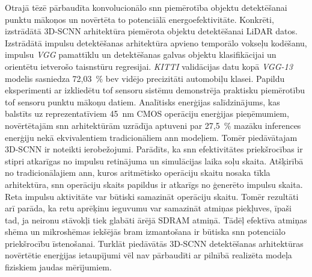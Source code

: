 Otrajā tēzē pārbaudīta konvolucionālo \Gls{snn} piemērotība objektu detektēšanai punktu mākoņos un novērtēta to potenciālā
energoefektivitāte.
Konkrēti, izstrādātā 3D-SCNN arhitektūra piemērota objektu detektēšanai LiDAR datos. Izstrādātā
impulsu detektēšanas arhitektūra apvieno temporālo vokseļu kodēšanu, impulsu \textit{VGG} pamattīklu un detektēšanas galvas
objektu klasifikācijai un orientētu ietverošo taisnstūru regresijai. \textit{KITTI} validācijas datu kopā \textit{VGG-13}
modelis sasniedza 72,03~\% \Gls{bev} vidējo precizitāti automobiļu klasei. Papildu eksperimenti ar izkliedētu \Gls{tof}
sensoru sistēmu demonstrēja praktisku piemērotību \Gls{tof} sensoru punktu mākoņu datiem. Analītisks enerģijas salīdzinājums,
kas balstīts uz reprezentatīviem 45~nm CMOS operāciju enerģijas pieņēmumiem, novērtētajām \Gls{snn} arhitektūrām uzrādīja
aptuveni par 27,5~\% mazāku inferences enerģiju nekā ekvivalentiem tradicionāliem \Gls{ann} modeļiem.
Tomēr piedāvātajam 3D-SCNN ir noteikti ierobežojumi. Parādīts, ka \Gls{snn} efektivitātes priekšrocības ir stipri atkarīgas
no impulsu retinājuma un simulācijas laika soļu skaita.
Atšķirībā no tradicionālajiem \Gls{ann}, kuros aritmētisko operāciju
skaitu nosaka tīkla arhitektūra, \Gls{snn} operāciju skaits papildus ir atkarīgs no ģenerēto impulsu skaita.
Reta impulsu aktivitāte var būtiski samazināt operāciju skaitu. Tomēr rezultāti arī parāda, ka retu aprēķinu ieguvumu var
samazināt atmiņas piekļuves, īpaši tad, ja neironu stāvokļi tiek glabāti ārējā SDRAM atmiņā. Tādēļ efektīva atmiņas shēma un
mikroshēmas iekšējās \Gls{bram} izmantošana ir būtiska \Gls{snn} potenciālo priekšrocību īstenošanai.
Turklāt piedāvātās 3D-SCNN detektēšanas arhitektūras novērtētie enerģijas ietaupījumi vēl nav pārbaudīti ar pilnībā realizēta
modeļa fiziskiem jaudas mērījumiem.

